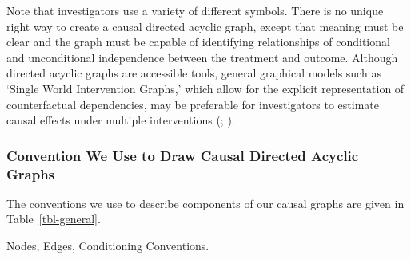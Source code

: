 \documentclass[
  single column]{article}
\begin{document}
Note that investigators use a variety of different symbols. There is no
unique right way to create a causal directed acyclic graph, except that
meaning must be clear and the graph must be capable of identifying
relationships of conditional and unconditional independence between the
treatment and outcome. Although directed acyclic graphs are accessible
tools, general graphical models such as `Single World Intervention
Graphs,' which allow for the explicit representation of counterfactual
dependencies, may be preferable for investigators to estimate causal
effects under multiple interventions
(;
).

\subsubsection{Convention We Use to Draw Causal Directed Acyclic
Graphs}\label{convention-we-use-to-draw-causal-directed-acyclic-graphs}

The conventions we use to describe components of our causal graphs are
given in Table~\ref{tbl-general}.

\begin{table}

\caption{\label{tbl-general}Nodes, Edges, Conditioning Conventions.}

\centering{

\terminologygeneraldags

}

\end{table}%
\end{document}
